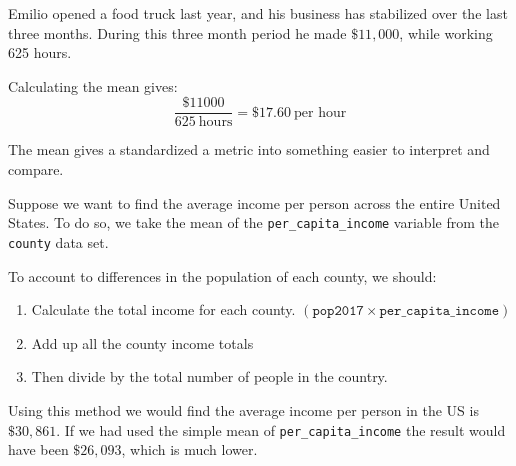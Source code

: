 \documentclass{beamer}
\begin{document}
\begin{frame}
\begin{example}
Emilio opened a food truck last year, and his business has stabilized over the last three months. During this three month period he made $\$11,000$, while working 625 hours.

\vspace{1mm}
\pause
{}\pause

\vspace{1mm}
Calculating the mean gives:
\begin{equation*}
\dfrac{\$11000}{625~\text{hours}} = \$17.60~\text{per hour}
\end{equation*}
\end{example}\pause

\begin{note}
The mean gives a standardized a metric into something easier to interpret and compare.
\end{note}
\end{frame}

\begin{frame}
\begin{example}
Suppose we want to find the average income per person across the entire United States. To do so, we take the mean of the \texttt{per\_capita\_income} variable from the \texttt{county} data set.

\vspace{1mm}
\pause
{}\pause

\vspace{1mm}
To account to differences in the population of each county, we should:
\begin{enumerate}
\item Calculate the total income for each county. {\small$\left(\texttt{pop2017}\times\texttt{per\_capita\_income}\right)$}\pause
\item Add up all the county income totals\pause
\item Then divide by the total number of people in the country.\pause
\end{enumerate}

Using this method we would find the average income per person in the US is $\$30,861$. If we had used the simple mean of \texttt{per\_capita\_income} the result would have been $\$26,093$, which is much lower.
\end{example}
\end{frame}
\end{document}

